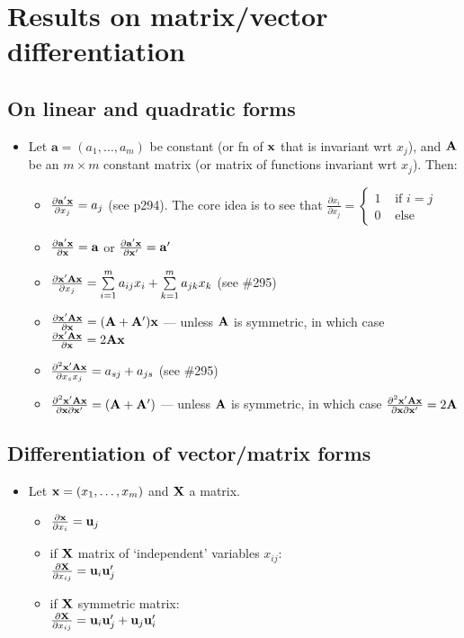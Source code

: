 \documentclass[a4paper, oneside]{book}
\begin{document}
\section{Results on matrix/vector differentiation}

\subsection*{On linear and quadratic forms}
\begin{itemize}
\item Let $\mathbf{a}=(a_1,\hdots,a_m)$ be constant (or fn of $\mathbf{x}$ that is invariant wrt $x_j$), and $\mathbf{A}$ be an $m\times m$ constant matrix (or matrix of functions invariant wrt $x_j$). Then:
\begin{itemize}\textsf{•}
\item $\frac{\partial  \mathbf{a'x}}{\partial x_j}=a_j$ (see p294). The core idea is to see that $\frac{\partial x_i}{\partial x_j}=\begin{cases}1 &\text{ if }i=j\\0& \text{ else}\end{cases}$
\item $\frac{\partial  \mathbf{a'x}}{\partial \mathbf{x}}=\mathbf{a}$ or $\frac{\partial  \mathbf{a'x}}{\partial \mathbf{x}'}=\mathbf{a}'$
\item $\frac{\partial \mathbf{x'Ax}}{\partial x_j} = \sum\limits_{i=1}^m a_{ij}x_i+\sum\limits_{k=1}^{m} a_{jk}x_k$ (see \#295)\\ 
\item $\frac{\partial \mathbf{x'Ax}}{\partial \mathbf{x}} = (\mathbf{A+A'})\mathbf{x}$ \---- unless $\mathbf{A}$ is symmetric, in which case $\frac{\partial \mathbf{x'Ax}}{\partial \mathbf{x}} = 2\mathbf{Ax}$
\item $\frac{\partial^2 \mathbf{x'Ax}}{\partial x_s x_j} = a_{sj}+a_{js}$ (see \#295)
\item $\frac{\partial^2 \mathbf{x'Ax}}{\partial \mathbf{x}\partial\mathbf{x}'} = (\mathbf{A+A'})$ \---- unless $\mathbf{A}$ is symmetric, in which case  $\frac{\partial^2 \mathbf{x'Ax}}{\partial \mathbf{x}\partial\mathbf{x}'} = 2\mathbf{A}$
\end{itemize}
\end{itemize}
%
\subsection*{Differentiation of vector/matrix forms}
\begin{itemize}
\item Let $\mathbf{x}=(x_1,\hdots,x_m)$ and $\mathbf{X}$ a matrix.
\begin{itemize}
\item $\frac{\partial \mathbf{x}}{\partial x_i} = \mathbf{u}_j$
\item if $\mathbf{X}$ matrix of `independent' variables $x_{ij}$:\\
$\frac{\partial \mathbf{X}}{\partial x_{ij}} = 	\mathbf{u}_i\mathbf{u}_j'$
\item if $\mathbf{X}$ symmetric matrix: \\
$\frac{\partial \mathbf{X}}{\partial x_{ij}} = \mathbf{u}_i\mathbf{u}_j'+\mathbf{u}_j	\mathbf{u}_i'$
%
\end{itemize}
\end{itemize}
\end{document}

